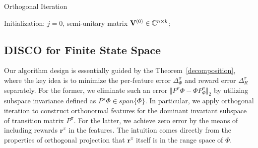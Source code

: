 \documentclass[onecolumn, conference]{IEEEtran}
\begin{document}
\begin{algorithm}[H]
        \caption{Orthogonal Iteration}\label{OI}


        Initialization: $j = 0$, semi-unitary matrix ${\bf V}^{(0)}\in \mathbb{C}^{n\times k}$; \\
\end{algorithm}
\subsection{DISCO for Finite State Space}\label{sec:small scale}

Our algorithm design is essentially guided by the Theorem~\ref{decomposition}, where the key idea is to minimize the per-feature error $\Delta_\Phi^\pi$ and reward error $\Delta_R^{\pi}$ separately. For the former, we eliminate such an error $\Vert P^\pi \Phi - \Phi P^\pi_\Phi\Vert_2$ by utilizing subspace invariance defined as $P^\pi\Phi \in span\{\Phi\}$. In particular, we apply orthogonal iteration to construct orthonormal features for the dominant invariant subspace of transition matrix $P^\pi$. For the latter, we achieve zero error by the means of including rewards $\boldsymbol{r}^\pi$ in the features. The intuition comes directly from the properties of orthogonal projection that $\boldsymbol{r}^\pi$ itself is in the range space of $\Phi$.
\end{document}

